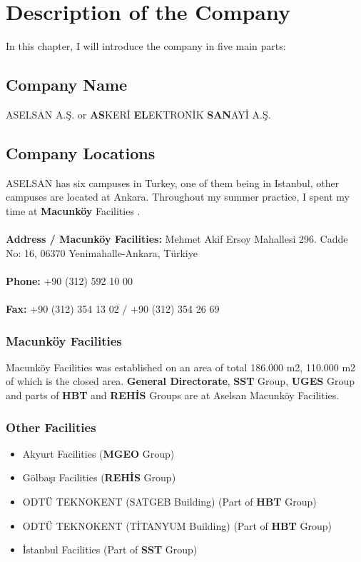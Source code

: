 \newpage

\section{Description of the Company}
\- \indent
	In this chapter, I will introduce the company in five main parts:



\subsection{Company Name}
\-
\indent ASELSAN A.Ş. or \textbf{AS}KERİ \textbf{EL}EKTRONİK \textbf{SAN}AYİ A.Ş.


\subsection{Company Locations}
\-\indent
	ASELSAN has six campuses in Turkey, one of them being in Istanbul, other campuses are located at Ankara. Throughout my summer practice, I spent my time at \textbf{Macunköy} Facilities . 
\\
\\
\textbf{ Address / Macunköy Facilities:} Mehmet Akif Ersoy Mahallesi 296. Cadde No: 16, 06370 Yenimahalle-Ankara, Türkiye
\\
\\
\textbf{ Phone:} +90 (312) 592 10 00
\\
\\
\textbf{ Fax:} +90 (312) 354 13 02 / +90 (312) 354 26 69


\subsubsection{Macunköy Facilities}
\- \indent

	Macunköy Facilities was established on an area of total 186.000 m2, 110.000 m2 of which is the closed area. \textbf{General Directorate}, \textbf{SST} Group, \textbf{UGES} Group and parts of \textbf{HBT} and \textbf{REHİS} Groups are at Aselsan Macunköy Facilities.



\subsubsection{Other Facilities}


\begin{itemize}
\item Akyurt Facilities (\textbf{MGEO} Group)
\item Gölbaşı Facilities (\textbf{REHİS} Group)
\item ODTÜ TEKNOKENT (SATGEB Building) (Part of \textbf{HBT} Group)
\item ODTÜ TEKNOKENT (TİTANYUM Building) (Part of \textbf{HBT} Group)
\item İstanbul Facilities (Part of \textbf{SST} Group)
\end{itemize}



